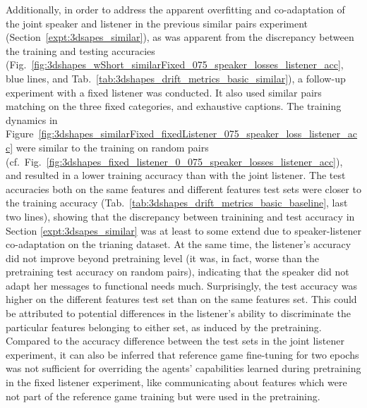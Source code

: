Additionally, in order to address the apparent overfitting and co-adaptation of the joint speaker and listener in the previous similar pairs experiment (Section~\ref{expt:3dsapes_similar}), as was apparent from the discrepancy between the training and testing accuracies (Fig.~\ref{fig:3dshapes_wShort_similarFixed_075_speaker_losses_listener_acc}, blue lines, and Tab.~\ref{tab:3dshapes_drift_metrics_basic_similar}), a follow-up experiment with a fixed listener was conducted. It also used similar pairs matching on the three fixed categories, and exhaustive captions. 
The training dynamics in Figure~\ref{fig:3dshapes_similarFixed_fixedListener_075_speaker_loss_listener_acc} were similar to the training on random pairs (cf.~Fig.~\ref{fig:3dshapes_fixed_listener_0_075_speaker_losses_listener_acc}), and resulted in a lower training accuracy than with the joint listener. The test accuracies both on the same features and different features test sets were closer to the training accuracy (Tab.~\ref{tab:3dshapes_drift_metrics_basic_baseline}, last two lines), showing that the discrepancy between trainining and test accuracy in Section \ref{expt:3dsapes_similar} was at least to some extend due to speaker-listener co-adaptation on the trianing dataset. At the same time, the listener's accuracy did not improve beyond pretraining level (it was, in fact, worse than the pretraining test accuracy on random pairs), indicating that the speaker did not adapt her messages to functional needs much. Surprisingly, the test accuracy was higher on the different features test set than on the same features set. This could be attributed to potential differences in the listener's ability to discriminate the particular features belonging to either set, as induced by the pretraining. Compared to the accuracy difference between the test sets in the joint listener experiment, it can also be inferred that reference game fine-tuning for two epochs was not sufficient for overriding the agents' capabilities learned during pretraining in the fixed listener experiment, like communicating about features which were not part of the reference game training but were used in the pretraining.


